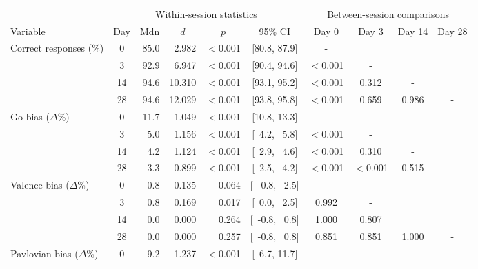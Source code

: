 \documentclass[a4paper,12pt]{article}
\begin{document}
\begin{refsection}[supp]
\begin{table}[h!]
    \centering
    \small
    \begin{adjustbox}{center}
    \begin{tabular}{lcrrrccccc}
        \toprule
                 & \multicolumn{5}{c}{Within-session statistics} & \multicolumn{4}{c}{Between-session comparisons} \\
        \cmidrule(lr){2-6} \cmidrule(lr){7-10}
        Variable & Day & Mdn & \multicolumn{1}{c}{$d$} & \multicolumn{1}{c}{$p$} & 95\% CI & Day 0 & Day 3 & Day 14 & Day 28 \\
        \midrule
         Correct responses (\%)     &  0 & 85.0 &  2.982 & $<$0.001 & [80.8, 87.9] &        - &       &       &   \\
                                    &  3 & 92.9 &  6.947 & $<$0.001 & [90.4, 94.6] & $<$0.001 & -     &       &   \\
                                    & 14 & 94.6 & 10.310 & $<$0.001 & [93.1, 95.2] & $<$0.001 & 0.312 & -     &   \\
                                    & 28 & 94.6 & 12.029 & $<$0.001 & [93.8, 95.8] & $<$0.001 & 0.659 & 0.986 & - \\
        \midrule
        Go bias ($\Delta$\%)        &  0 & 11.7 &  1.049 & $<$0.001 & [10.8, 13.3] &        - &       &       &   \\
                                    &  3 &  5.0 &  1.156 & $<$0.001 & [\ 4.2, \ 5.8] & $<$0.001 & -     &       &   \\
                                    & 14 &  4.2 &  1.124 & $<$0.001 & [\ 2.9, \ 4.6] & $<$0.001 & 0.310 & -     &   \\
                                    & 28 &  3.3 &  0.899 & $<$0.001 & [\ 2.5, \ 4.2] & $<$0.001 & $<$0.001 & 0.515 & - \\
        \midrule
        Valence bias ($\Delta$\%)   &  0 &  0.8 &  0.135 &    0.064 & [\ -0.8, \ 2.5] &        - &       &       &   \\
                                    &  3 &  0.8 &  0.169 &    0.017 & [\ 0.0, \ 2.5]  & 0.992 & -     &       &   \\
                                    & 14 &  0.0 &  0.000 &    0.264 & [\ -0.8, \ 0.8] & 1.000 & 0.807     &       &   \\
                                    & 28 &  0.0 &  0.000 &    0.257 & [\ -0.8, \ 0.8] & 0.851 & 0.851 & 1.000 & - \\       
        \midrule
        Pavlovian bias ($\Delta$\%) &  0 & 9.2 & 1.237 & $<$0.001 & [\ 6.7, 11.7] &        - &       &       &   \\

\end{tabular}
\end{adjustbox}
\end{table}
\end{refsection}
\end{document}
